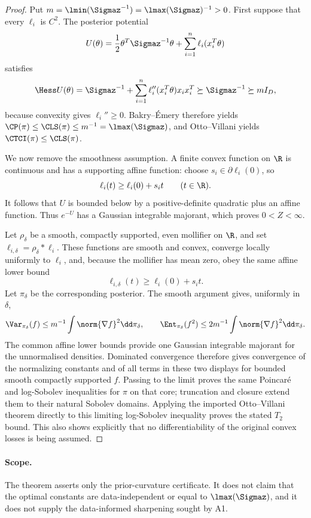 \documentclass[../main.tex]{subfiles}
\begin{document}
\begin{proof}
Put \(m=\lmin(\Sigmaz^{-1})=\lmax(\Sigmaz)^{-1}>0\).  First suppose that every
\(\ell_i\) is \(C^2\).  The posterior potential
\[
 U(\theta)=\frac12\theta^T\Sigmaz^{-1}\theta+
           \sum_{i=1}^n\ell_i(x_i^T\theta)
\]
satisfies
\[
 \Hess U(\theta)=\Sigmaz^{-1}+
 \sum_{i=1}^n\ell_i''(x_i^T\theta)x_ix_i^T
 \succeq\Sigmaz^{-1}\succeq mI_D,
\]
because convexity gives \(\ell_i''\ge0\).  Bakry--\'Emery therefore yields
\(\CP(\pi)\le\CLS(\pi)\le m^{-1}=\lmax(\Sigmaz)\), and Otto--Villani yields
\(\CTCI(\pi)\le\CLS(\pi)\).

We now remove the smoothness assumption.  A finite convex function on \(\R\) is continuous and
has a supporting affine function: choose \(s_i\in\partial\ell_i(0)\), so
\[
 \ell_i(t)\ge \ell_i(0)+s_it\qquad(t\in\R).
\]
It follows that \(U\) is bounded below by a positive-definite quadratic plus an affine function.
Thus \(e^{-U}\) has a Gaussian integrable majorant, which proves \(0<Z<\infty\).

Let \(\rho_\delta\) be a smooth, compactly supported, even mollifier on \(\R\), and set
\(\ell_{i,\delta}=\rho_\delta*\ell_i\).  These functions are smooth and convex, converge
locally uniformly to \(\ell_i\), and, because the mollifier has mean zero, obey the same affine
lower bound
\[
 \ell_{i,\delta}(t)\ge \ell_i(0)+s_it.
\]
Let \(\pi_\delta\) be the corresponding posterior.  The smooth argument gives, uniformly in
\(\delta\),
\[
 \Var_{\pi_\delta}(f)\le m^{-1}\int\norm{\nabla f}^2\dd\pi_\delta,
 \qquad
 \Ent_{\pi_\delta}(f^2)\le2m^{-1}\int\norm{\nabla f}^2\dd\pi_\delta.
\]
The common affine lower bounds provide one Gaussian integrable majorant for the unnormalised
densities.  Dominated convergence therefore gives convergence of the normalizing constants and
of all terms in these two displays for bounded smooth compactly supported \(f\).  Passing to the
limit proves the same Poincar\'e and log-Sobolev inequalities for \(\pi\) on that core; truncation
and closure extend them to their natural Sobolev domains.  Applying the imported Otto--Villani
theorem directly to this limiting log-Sobolev inequality proves the stated \(T_2\) bound.  This
also shows explicitly that no differentiability of the original convex losses is being assumed.
\end{proof}

\paragraph{Scope.}
The theorem asserts only the prior-curvature certificate.  It does not claim that the optimal
constants are data-independent or equal to \(\lmax(\Sigmaz)\), and it does not supply the
data-informed sharpening sought by A1.
\end{document}
